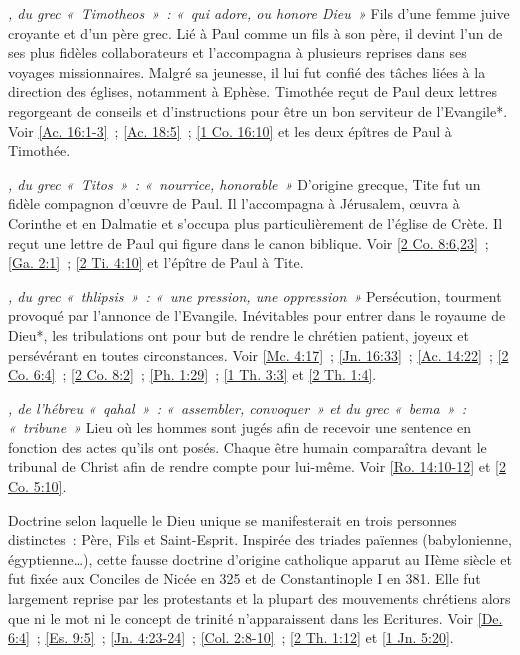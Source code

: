 \begin{multicols}{2}
\textit{, du grec «~Timotheos~»~: «~qui adore, ou honore Dieu~»}\newline
Fils d'une femme juive croyante et d'un père grec. Lié à Paul comme un fils à son père, il devint l'un de ses plus fidèles collaborateurs et l'accompagna à plusieurs reprises dans ses voyages missionnaires. Malgré sa jeunesse, il lui fut confié des tâches liées à la direction des églises, notamment à Ephèse. Timothée reçut de Paul deux lettres regorgeant de conseils et d'instructions pour être un bon serviteur de l'Evangile*. Voir \vref{Ac. 16:1-3}~; \vref{Ac. 18:5}~; \vref{1 Co. 16:10} et les deux épîtres de Paul à Timothée.

\textit{, du grec «~Titos~»~: «~nourrice, honorable~»}\newline
D'origine grecque, Tite fut un fidèle compagnon d'œuvre de Paul. Il l'accompagna à Jérusalem, œuvra à Corinthe et en Dalmatie et s'occupa plus particulièrement de l'église de Crète. Il reçut une lettre de Paul qui figure dans le canon biblique.\newline
Voir \vref{2 Co. 8:6,23}~; \vref{Ga. 2:1}~; \vref{2 Ti. 4:10} et l'épître de Paul à Tite.

\textit{, du grec «~thlipsis~»~: «~une pression, une oppression~»}\newline
Persécution, tourment provoqué par l'annonce de l'Evangile. Inévitables pour entrer dans le royaume de Dieu*, les tribulations ont pour but de rendre le chrétien patient, joyeux et persévérant en toutes circonstances.\newline
Voir \vref{Mc. 4:17}~; \vref{Jn. 16:33}~; \vref{Ac. 14:22}~; \vref{2 Co. 6:4}~; \vref{2 Co. 8:2}~; \vref{Ph. 1:29}~; \vref{1 Th. 3:3} et \vref{2 Th. 1:4}.

\textit{, de l'hébreu «~qahal~»~: «~assembler, convoquer~» et du grec «~bema~»~: «~tribune~»}\newline
Lieu où les hommes sont jugés afin de recevoir une sentence en fonction des actes qu'ils ont posés. Chaque être humain comparaîtra devant le tribunal de Christ afin de rendre compte pour lui-même. Voir \vref{Ro. 14:10-12} et \vref{2 Co. 5:10}.

\textit{}\newline
Doctrine selon laquelle le Dieu unique se manifesterait en trois personnes distinctes~: Père, Fils et Saint-Esprit. Inspirée des triades païennes (babylonienne, égyptienne…), cette fausse doctrine d'origine catholique apparut au IIème siècle et fut fixée aux Conciles de Nicée en 325 et de Constantinople I en 381. Elle fut largement reprise par les protestants et la plupart des mouvements chrétiens alors que ni le mot ni le concept de trinité n'apparaissent dans les Ecritures.\newline
Voir \vref{De. 6:4}~; \vref{Es. 9:5}~; \vref{Jn. 4:23-24}~; \vref{Col. 2:8-10}~; \vref{2 Th. 1:12} et \vref{1 Jn. 5:20}.


\end{multicols}
